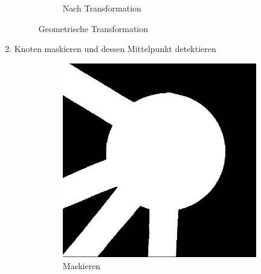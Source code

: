 \begin{enumerate}
\begin{figure}[H]
\begin{subfigure}{0.4\textwidth}
        \caption{Nach Transformation}
        \label{fig:node-after-geometric-transform}
        \end{subfigure}
        \caption{Geometrische Transformation}
        \label{fig:node-geometric-transform}
        \end{figure}
    \item Knoten maskieren und dessen Mittelpunkt detektieren
        \begin{figure}[H]
        \centering
        \begin{subfigure}{0.4\textwidth}
        \includegraphics[width=0.95\linewidth]{assets/informatik-prototyp/opencv/angle_detection/node_after_transformation_masked.png} 
        \caption{Maskieren}
        \label{fig:node-masked}
        \end{subfigure}
        \begin{subfigure}{0.4\textwidth}

\end{subfigure}
\end{figure}
\end{enumerate}
